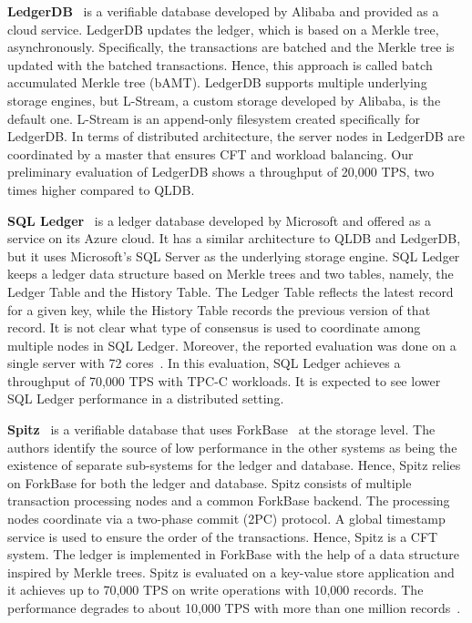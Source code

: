 \documentclass[11pt]{article}
\begin{document}
\textbf{LedgerDB}~\cite{ledgerdb} is a verifiable database developed by Alibaba and provided as a cloud service. LedgerDB updates the ledger, which is based on a Merkle tree, asynchronously. Specifically, the transactions are batched and the Merkle tree is updated with the batched transactions. Hence, this approach is called batch accumulated Merkle tree (bAMT). LedgerDB supports multiple underlying storage engines, but L-Stream, a custom storage developed by Alibaba, is the default one. L-Stream is an append-only filesystem created specifically for LedgerDB. In terms of distributed architecture, the server nodes in LedgerDB are coordinated by a master that ensures CFT and workload balancing. Our preliminary evaluation of LedgerDB shows a throughput of 20,000 TPS, two times higher compared to QLDB.


\textbf{SQL Ledger}~\cite{sqlledger2021} is a ledger database developed by Microsoft and offered as a service on its Azure cloud. It has a similar architecture to QLDB and LedgerDB, but it uses Microsoft's SQL Server as the underlying storage engine. SQL Ledger keeps a ledger data structure based on Merkle trees and two tables, namely, the Ledger Table and the History Table. The Ledger Table reflects the latest record for a given key, while the History Table records the previous version of that record. It is not clear what type of consensus is used to coordinate among multiple nodes in SQL Ledger. Moreover, the reported evaluation was done on a single server with 72 cores~\cite{sqlledger2021}. In this evaluation, SQL Ledger achieves a throughput of 70,000 TPS with TPC-C workloads. It is expected to see lower SQL Ledger performance in a distributed setting.


\textbf{Spitz}~\cite{spitz} is a verifiable database that uses ForkBase~\cite{forkbase} at the storage level. The authors identify the source of low performance in the other systems as being the existence of separate sub-systems for the ledger and database. Hence, Spitz relies on ForkBase for both the ledger and database. Spitz consists of multiple transaction processing nodes and a common ForkBase backend. The processing nodes coordinate via a two-phase commit (2PC) protocol. A global timestamp service is used to ensure the order of the transactions. Hence, Spitz is a CFT system. The ledger is implemented in ForkBase with the help of a data structure inspired by Merkle trees. Spitz is evaluated on a key-value store application and it achieves up to 70,000 TPS on write operations with 10,000 records. The performance degrades to about 10,000 TPS with more than one million records~\cite{spitz}.
\end{document}
